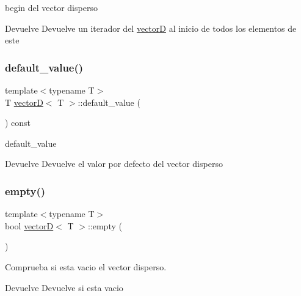 begin del vector disperso 

\begin{DoxyReturn}{Devuelve}
Devuelve un iterador del \hyperlink{classvectorD}{vectorD} al inicio de todos los elementos de este 
\end{DoxyReturn}
\mbox{\label{classvectorD_ad1f0d076a2514fce062bbe0189fbcef1}} 
\subsubsection{\texorpdfstring{default\+\_\+value()}{default\_value()}}
{\footnotesize\ttfamily template$<$typename T$>$ \\
T \hyperlink{classvectorD}{vectorD}$<$ T $>$\+::default\+\_\+value (\begin{DoxyParamCaption}{ }\end{DoxyParamCaption}) const}



default\+\_\+value 

\begin{DoxyReturn}{Devuelve}
Devuelve el valor por defecto del vector disperso 
\end{DoxyReturn}
\mbox{\label{classvectorD_a461a5d4cd0f19315027629b8d1e13c03}} 
\subsubsection{\texorpdfstring{empty()}{empty()}}
{\footnotesize\ttfamily template$<$typename T$>$ \\
bool \hyperlink{classvectorD}{vectorD}$<$ T $>$\+::empty (\begin{DoxyParamCaption}{ }\end{DoxyParamCaption})}



Comprueba si esta vacio el vector disperso. 

\begin{DoxyReturn}{Devuelve}
Devuelve si esta vacio 
\end{DoxyReturn}
\mbox{\label{classvectorD_af2301219618c45aa9fc785819351b67a}} 
